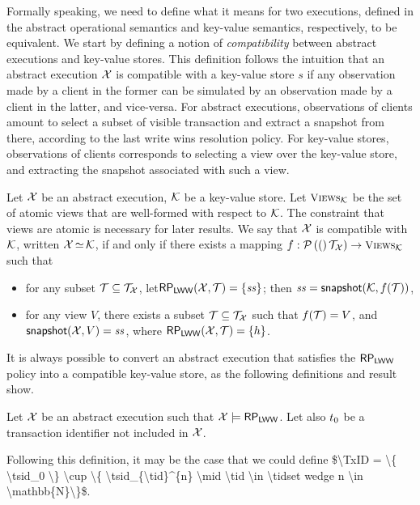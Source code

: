 Formally speaking, we need to define what it means for two executions, defined in the abstract operational semantics and key-value semantics, respectively, 
to be equivalent. We start by defining a notion of \emph{compatibility} between abstract executions and key-value stores. 
This definition follows the intuition that an abstract execution $\mathcal{X}$ is compatible with a key-value store $s$ if 
any observation made by a client in the former can be simulated by an observation made by a client in the latter, and vice-versa. 
For abstract executions, observations of clients amount to select a subset of visible transaction and extract 
a snapshot from there, according to the last write wins resolution policy. For key-value stores, 
observations of clients corresponds to selecting a view over the key-value store, and extracting the snapshot 
associated with such a view.

\begin{definition}
Let $\mathcal{X}$ be an abstract execution, $\mathcal{K}$ be a key-value store. 
Let $\Views_{\hh}$ be the set of atomic views that are well-formed with 
respect to $\mathcal{K}$.
\ac{The constraint that views are atomic is necessary for later results.}
We say that $\mathcal{X}$ is compatible with $\mathcal{K}$, written 
$\mathcal{X} \mathop{\simeq} \mathcal{K}$, if and only if there exists a  mapping 
$f: \powerset(\T_{\aexec}) \rightarrow \Views_{\hh}$
such that  
\begin{itemize}
\item for any subset $\mathcal{T} \subseteq \mathcal{T}_{\mathcal{X}}$, let$\mathsf{RP}_{\mathsf{LWW}}(\mathcal{X}, \mathcal{T}) = \{\mathit{ss}\}$; 
then $\mathit{ss} = \mathsf{snapshot}(\mathcal{K}, f(\mathcal{T}))$, 
\item for any view $V$, there exists a subset $\mathcal{T} \subseteq \mathcal{T}_{\mathcal{X}}$ 
such that $f(\mathcal{T}) = V$, and $\mathsf{snapshot}(\mathcal{X}, V) = \mathit{ss}$, where 
$\mathsf{RP}_{\mathsf{LWW}}(\mathcal{X}, \mathcal{T}) = \{h\}$.
\end{itemize}
\end{definition}

It is always possible to convert an abstract execution that satisfies the $\mathsf{RP}_{\mathsf{LWW}}$ 
policy into a compatible 
key-value store, as the following definitions and result show.
\begin{definition}
Let $\mathcal{X}$ be an abstract execution such that $\mathcal{X} \models \mathsf{RP}_{\mathsf{LWW}}$. 
Let also $t_0$ be a transaction identifier not included in $\mathcal{X}$. 
\end{definition}
\ac{Following this definition, it may be the case that we could define 
$\TxID = \{ \tsid_0 \} \cup \{ \tsid_{\tid}^{n} \mid \tid \in \tidset wedge n \in \mathbb{N}\}$.
}


